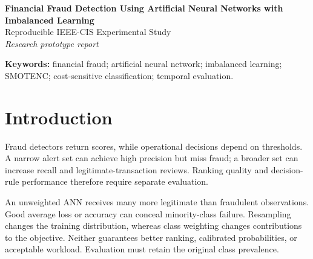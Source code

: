 \documentclass[11pt,a4paper]{article}
\begin{document}
\begin{center}
{\bfseries\LARGE Financial Fraud Detection Using Artificial Neural Networks with Imbalanced Learning}\\[8pt]
{\large Reproducible IEEE-CIS Experimental Study}\\[4pt]
{\normalsize\itshape Research prototype report}
\end{center}
\vspace{8pt}
\begin{abstract}
Financial fraud detection combines rare positive events, changing transaction behaviour, and costly classification errors. This study compares three configurable feed-forward artificial neural networks (ANNs): an unweighted baseline, categorical-aware synthetic oversampling, and class-weighted binary cross-entropy. IEEE-CIS transaction and identity records are joined with validated unique keys. A shared chronological train--validation--test protocol preserves natural holdout prevalence, fits preprocessing on training only, and selects checkpoints and thresholds on validation data. Three initialization seeds are evaluated for each method on full labeled data, with a separate development-sample study. A PyTorch worker, FastAPI service, notebook, and Next.js laboratory share canonical artifacts containing configurations, splits, probabilities, metrics, and software versions. Generated results emphasize average precision, precision, recall, and missed fraud. The system supports auditable research and model inspection; local validation does not establish suitability for production financial decisions.
\end{abstract}
\noindent\textbf{Keywords:} financial fraud; artificial neural network; imbalanced learning; SMOTENC; cost-sensitive classification; temporal evaluation.

\section{Introduction}
Fraud detectors return scores, while operational decisions depend on thresholds. A narrow alert set can achieve high precision but miss fraud; a broader set can increase recall and legitimate-transaction reviews. Ranking quality and decision-rule performance therefore require separate evaluation.

An unweighted ANN receives many more legitimate than fraudulent observations. Good average loss or accuracy can conceal minority-class failure. Resampling changes the training distribution, whereas class weighting changes contributions to the objective. Neither guarantees better ranking, calibrated probabilities, or acceptable workload. Evaluation must retain the original class prevalence.
\end{document}
